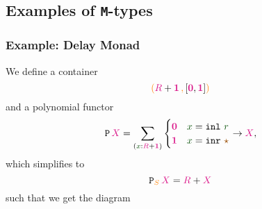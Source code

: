 \documentclass[xelatex,mathserif,serif,notheorems]{beamer} %
\theoremstyle{plain} %
\theoremstyle{definition}
\theoremstyle{remark}
\newcommand*{\term}[1]{\textcolor{green!30!black}{#1}} %
\newcommand*{\type}[1]{\textcolor{magenta!90!black}{#1}}
\newcommand*{\container}[1]{\textcolor{orange}{#1}}
\newcommand*{\containerpair}[2]{\ensuremath{\colorlet{savedleftcolor}{.}\color{orange}\left(\color{savedleftcolor}#1\,\textcolor{orange}{\mathbf{,}}\,#2\color{orange}\right)\color{savedleftcolor}}}
\newcommand*{\unit}{\type{\textbf{1}}}
\newcommand*{\empt}{\type{\textbf{0}}}
\newcommand*{\constant}[1]{\textcolor{orange!60!black}{\ensuremath{\mathtt{#1}}}}
\newcommand*{\function}[1]{\textcolor{blue!60!black}{\ensuremath{\mathtt{#1}}}}
\newcommand*{\constructor}[1]{\textcolor{purple!60!black}{\ensuremath{\mathtt{#1}}}}
\newcommand*{\typeformer}[1]{\ensuremath{\mathtt{#1}}}
\newcommand*{\functor}[1]{\ensuremath{\mathbf{\mathtt{#1}}}}
\newcommand*{\unitelem}{\constant{\star}} %
\begin{document}
\subsection{Examples of \texttt{M}-types}
\begin{frame}[fragile]
  \frametitle{Example: Delay Monad}
  We define a container
  \begin{equation}
    \containerpair{\type{R} + \unit}{[\empt, \unit]}
  \end{equation}
  and a polynomial functor
  \begin{equation}
    \functor{P}\,\type{X} = \sum_{(\term{x} : \type{R} + \unit)} \begin{cases} \empt & \term{x} = \mathtt{inl}~\term{r} \\ \unit & \term{x} = \mathtt{inr}~\unitelem \end{cases} \rightarrow \type{X},
  \end{equation}
  which simplifies to
  \begin{equation}
    \functor{P}_{\container{S}}\,\type{X} = \type{R} + \type{X}
  \end{equation}
  such that we get the diagram
  \begin{figure}[h]
    \centering
  \end{figure}
\end{frame}
\end{document}
